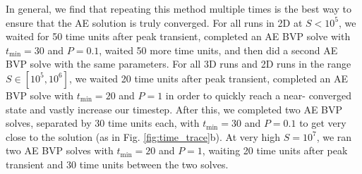 \documentclass[aps, pre, onecolumn, nofootinbib, notitlepage, groupedaddress, amsfonts, amssymb, amsmath, longbibliography]{revtex4-1}
\begin{document}
In general, we find that repeating this method multiple times is the best way to
ensure that the AE solution is truly converged. For all runs in 2D at $S < 10^5$, we
waited for 50 time units after peak transient, completed an AE BVP solve
with $t_{\text{min}} = 30$ and $P = 0.1$, waited 50 more time units, and then
did a second AE BVP solve with the same parameters.
For all 3D runs and 2D runs in the range $S \in [10^5, 10^6]$,
we waited 20 time units after peak transient, completed an AE BVP solve
with $t_{\text{min}} = 20$ and $P = 1$ in order to quickly reach a near-
converged state and vastly increase our timestep.  After this, we completed
two AE BVP solves, separated by 30 time units each, with $t_{\text{min}} = 30$
and $P = 0.1$ to get very close to the solution (as in Fig. \ref{fig:time_trace}b).
At very high $S = 10^7$, we ran two AE BVP solves with $t_{\text{min}} = 20$ and
$P = 1$, waiting 20 time units after peak transient and 30 time units between
the two solves.
\end{document}
